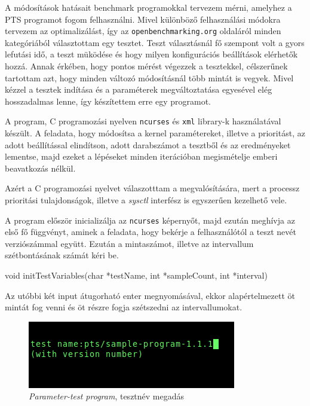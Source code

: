 A módosítások hatásait benchmark programokkal tervezem mérni, amelyhez a PTS programot fogom felhasználni. Mivel különböző felhasználási módokra tervezem az optimalizálást, így az \texttt{openbenchmarking.org} oldaláról minden kategóriából választottam egy tesztet. 
Teszt választásnál fő szempont volt a gyors lefutási idő, a teszt müködése és hogy milyen konfigurációs beállítások elérhetők hozzá. Annak érkében, hogy pontos mérést végezzek a tesztekkel, célszerűnek tartottam azt, hogy minden változó módosításnál több mintát is vegyek.
Mivel kézzel a tesztek indítása és a paraméterek megváltoztatása egyesével elég hosszadalmas lenne, így készítettem erre egy programot.


A program, C programozási nyelven \texttt{ncurses} és \texttt{xml} library-k használatával készült.
A feladata, hogy módosítsa a kernel paramétereket, illetve a prioritást, az adott beállítással elindítson, adott darabszámot a tesztből és az eredményeket lementse, majd ezeket a lépéseket minden iterációban megismételje emberi beavatkozás nélkül.

Azért a C programozási nyelvet válaszotttam a megvalósítására, mert a processz prioritási tulajdonságok, illetve a \textit{sysctl} interfész is egyszerűen kezelhető vele.


A program először inicializálja az \texttt{ncurses} képernyőt, majd ezután meghívja az első fő függvényt, aminek a feladata, hogy bekérje a felhasználótól a teszt nevét verziószámmal együtt. Ezután a mintaszámot, illetve az intervallum szétbontásának számát kéri be.  

\begin{cpp}
void initTestVariables(char *testName, int *sampleCount, int *interval)
\end{cpp}

Az utóbbi két input átugorható enter megnyomásával, ekkor alapértelmezett öt mintát fog venni és öt részre fogja szétszedni az intervallumokat.

\begin{figure}[h!]
\centering
\includegraphics[scale=3.0]{images/parameter-testInit.png}
\caption{\textit{Parameter-test program}, tesztnév megadás}
\label{fig:parameter-testInit}
\end{figure}

